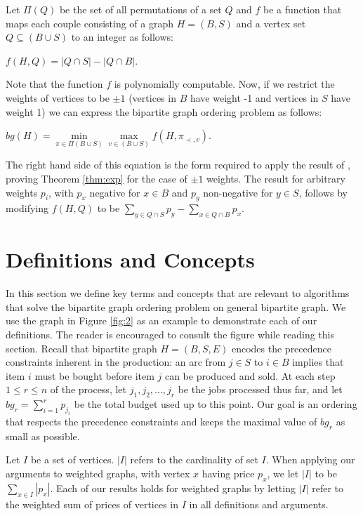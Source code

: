 \documentclass[letterpaper,11pt,abstracton]{scrartcl}
\begin{document}
Let $\Pi(Q)$ be the set of all permutations of a set $Q$ and $f$ be a
function that maps each couple consisting of a graph $H=(B,S)$ and a
vertex set $Q\subseteq (B\cup S)$ to an integer as
follows:

\begin{center}
$f(H, Q)=|Q\cap S|-| Q\cap B|$.
\end{center}
Note that the function $f$ is polynomially computable. Now, if we
restrict the weights of vertices to be $\pm 1$ (vertices in $B$ have
weight -1 and vertices in $S$ have weight 1) we can express the
bipartite graph ordering problem as follows:

\begin{center}
$bg(H)=\min\limits_{\pi\in\Pi(B\cup S)} \max\limits_{v\in(B\cup S)}f(H, \pi_{\prec,v})$.
\end{center}

The right hand side of this equation is the form required to apply the result of
\cite{BFKKT}, proving Theorem \ref{thm:exp} for the case of $\pm 1$ weights.
The result for arbitrary weights $p_i$, with $p_x$ negative for $x\in B$ and
$p_y$ non-negative for $y\in S$, follows by modifying $f(H,Q)$ to be
$\sum_{y\in Q\cap S} p_y -\sum_{x\in Q\cap B} p_x $.



\section{Definitions and Concepts} \label{sec:main}

In this section we define key terms and concepts that are relevant to
algorithms that solve the bipartite graph ordering problem on general bipartite graph.  We use the graph in Figure \ref{fig:2} as an example to
demonstrate each of our definitions.  The reader is encouraged to
consult the figure while reading this section.  Recall that bipartite graph
$H=(B,S,E)$ encodes the precedence constraints inherent in the
production: an arc from $j\in S$ to $i\in B$ implies that item $i$
must be bought before item $j$ can be produced and sold.
At each step $1 \le r \le n$ of the process, let $j_1, j_2, ..., j_r$ be the jobs processed
thus far, and let $bg_r = \sum_{i=1}^r p_{j_i}$ be the total budget used
up to this point.  Our goal is an ordering that respects the precedence
constraints and keeps the maximal value of $bg_r$ as small as possible.


Let $I$ be a set of vertices. $|I|$ refers to the cardinality of set
$I$.  When applying our arguments to weighted graphs, with vertex $x$
having price $p_x$, we let $|I|$ to be $\sum_{x\in I} |p_x|$.
Each of our results holds for weighted graphs by letting $|I|$ refer
to the weighted sum of prices of vertices in $I$ in all definitions and
arguments.
\end{document}
